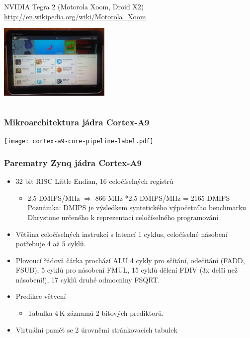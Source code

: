 \documentclass{beamer}
\begin{document}
\begin{frame}
\begin{columns}
\begin{column}{0.5\textwidth}
\begin{center}
  \end{center}
  {\scriptsize
  NVIDIA Tegra 2 (Motorola Xoom, Droid X2) \tiny \linebreak
  \url{http://en.wikipedia.org/wiki/Motorola_Xoom}
  }
  \begin{center}
    \includegraphics[width=0.4\textwidth]{fig/motorola-xoom.jpg}
  \end{center}
\end{column}
\end{columns}
\end{frame}

\begin{frame}
\frametitle{Mikroarchitektura jádra Cortex-A9}

\texttt{[image: cortex-a9-core-pipeline-label.pdf]}

\end{frame}

\begin{frame}
\frametitle{Parematry Zynq jádra Cortex-A9}

\begin{itemize}
 \item 32 bit RISC Little Endian, 16 celočíselných registrů
 \begin{itemize}
  \item 2,5 DMIPS/MHz $\Rightarrow$ 866 MHz *2,5 DMIPS/MHz = 2165 DMIPS
  {\newline Poznámka: DMIPS je výsledkem syntetického výpočetního benchmarku Dhrystone určeného k reprezentaci celočíselného programování}
 \end{itemize}
 \item Většina celočíselných instrukcí s latencí 1 cyklus, celočíselné násobení potřebuje 4 až 5 cyklů.
 \item  Plovoucí řádová čárka prochází ALU 4 cykly pro sčítání, odečítání (FADD, FSUB), 5 cyklů pro násobení FMUL, 15 cyklů dělení FDIV (3x delší než násobení!), 17 cyklů druhé odmocniny FSQRT.
 \item Predikce větvení
 \begin{itemize}
  \item Tabulka 4\,K záznamů 2-bitových prediktorů.
 \end{itemize}
 \item Virtuální paměť se 2 úrovněmi stránkovacích tabulek
\end{itemize}

\end{frame}
\end{document}
